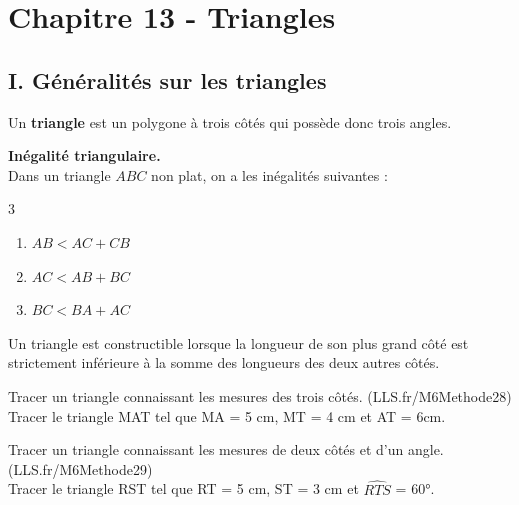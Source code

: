 \section*{Chapitre 13 - Triangles}

\subsection*{I. Généralités sur les triangles}

  \vspace{0.3cm}
\begin{Définition}
Un \textbf{triangle} est un polygone à trois côtés qui possède donc trois angles.
\end{Définition}
   \vspace{0.3cm}
\begin{Propriété}[c]\textbf{Inégalité triangulaire.}\\
Dans un triangle $ABC$ non plat, on a les inégalités suivantes :
\vspace{-0.5cm}
\begin{multicols}{3}
\begin{enumerate}
\item $AB < AC + CB$
\item $AC < AB + BC$
\item $BC < BA + AC$
\end{enumerate}
\end{multicols}
\end{Propriété}
 
  \vspace{0.3cm}
\begin{Propriété}[c]
Un triangle est constructible lorsque la longueur de son plus grand côté est strictement inférieure à la somme des longueurs des deux autres côtés.
\end{Propriété}
  \vspace{0.3cm}
 
\begin{Méthode} {\footnotesize Tracer un triangle connaissant les mesures des trois côtés. (LLS.fr/M6Methode28)} \\
Tracer le triangle MAT tel que MA = 5 cm, MT = 4 cm et AT = 6cm.

\vspace{6cm}

\end{Méthode}
  \vspace{0.3cm}
\begin{Méthode} {\footnotesize Tracer un triangle connaissant les mesures de deux côtés et d'un angle. (LLS.fr/M6Methode29) }\\
Tracer le triangle RST tel que RT = 5 cm, ST = 3 cm et $\widehat{RTS}$ = 60°.

\vspace{5cm}

\end{Méthode}

